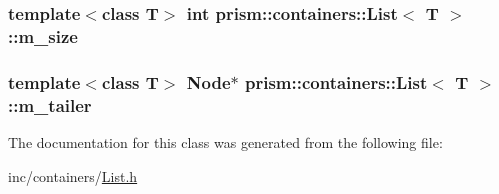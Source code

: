 \subsubsection[{\texorpdfstring{m\+\_\+size}{m_size}}]{\setlength{\rightskip}{0pt plus 5cm}template$<$class T$>$ int {\bf prism\+::containers\+::\+List}$<$ T $>$\+::m\+\_\+size\hspace{0.3cm}{\ttfamily [protected]}}\hypertarget{classprism_1_1containers_1_1_list_a0aa092d322df5228c2eec7863fe22b7e}{}\label{classprism_1_1containers_1_1_list_a0aa092d322df5228c2eec7863fe22b7e}
\subsubsection[{\texorpdfstring{m\+\_\+tailer}{m_tailer}}]{\setlength{\rightskip}{0pt plus 5cm}template$<$class T$>$ Node$\ast$ {\bf prism\+::containers\+::\+List}$<$ T $>$\+::m\+\_\+tailer\hspace{0.3cm}{\ttfamily [protected]}}\hypertarget{classprism_1_1containers_1_1_list_aab976f075243f4b000e756e1434b59c8}{}\label{classprism_1_1containers_1_1_list_aab976f075243f4b000e756e1434b59c8}


The documentation for this class was generated from the following file\+:\begin{DoxyCompactItemize}
\item 
inc/containers/\hyperlink{_list_8h}{List.\+h}\end{DoxyCompactItemize}
